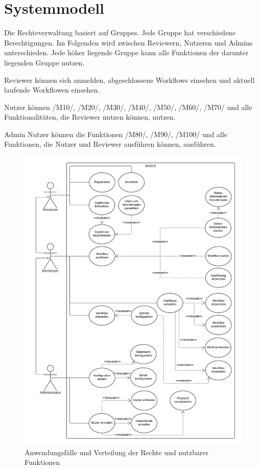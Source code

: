 \chapter{Systemmodell}
Die Rechteverwaltung basiert auf \glspl{Gruppe}. Jede Gruppe hat verschiedene Berechtigungen. Im Folgenden wird zwischen \gls{Reviewer}n, \glspl{Nutzer}n und \glspl{Admin} unterschieden.
Jede höher liegende Gruppe kann alle Funktionen der darunter liegenden Gruppe nutzen.

\gls{Reviewer} können sich anmelden, abgeschlossene Workflows einsehen und aktuell laufende \gls{Workflow}en einsehen.

\gls{Nutzer} können /M10/, /M20/, /M30/, /M40/, /M50/, /M60/, /M70/ und alle Funktionalitäten, die \gls{Reviewer} nutzen können, nutzen.

\gls{Admin} Nutzer können die Funktionen /M80/, /M90/, /M100/ und alle Funktionen, die \gls{Nutzer} und \gls{Reviewer} ausführen können, ausführen.


\begin{figure}[ht]
    \centering
    \includegraphics[width = \textwidth]{Grafiken/Diagramme/Anwendungsfalldiagramm.png}
    \caption{Anwendungsfälle und Verteilung der Rechte und nutzbarer Funktionen}
    \label{fig:Anwfalldiag}
\end{figure}